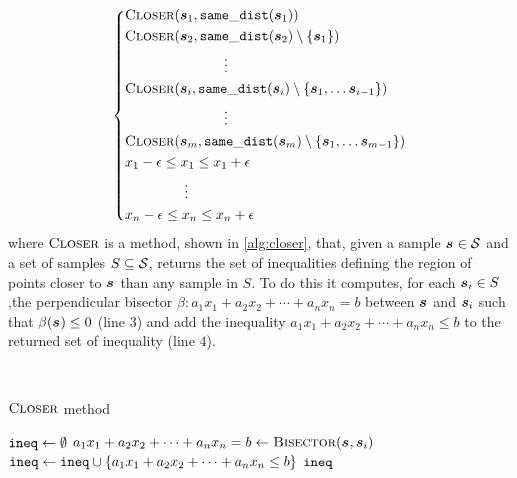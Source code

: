 \begin{equation}
\label{polytope-system}
  \left\{
  \begin{aligned}
    &\textsc{Closer}(\sample[1], \samedist{\sample[1]})\\
    &\textsc{Closer}(\sample[2], \samedist{\sample[2]}\setminus\{\sample[1]\})\\
    &\hspace{2.5cm}\vdots\\
    &\textsc{Closer}(\sample[i], \samedist{\sample[i]}\setminus\{\sample[1],\ldots \sample[i-1]\})\\
    &\hspace{2.5cm}\vdots\\
    &\textsc{Closer}(\sample[m], \samedist{\sample[m]}\setminus\{\sample[1],\ldots \sample[m-1]\})\\
    &x_1 - \epsilon \le x_1 \le x_1 + \epsilon\\
    &\hspace{1.5cm}\vdots\\
    &x_n - \epsilon \le x_n \le x_n + \epsilon
  \end{aligned}
  \right.
\end{equation}
where $\algtitle{Closer}$ is a method, shown in \autoref{alg:closer}, that, given a sample $\sample[] \in \set$ and a set of samples $S \subseteq  \set$, returns the set of inequalities defining the region of points closer to $\sample[]$ than any sample in $S$. To do this it computes, for each $\sample \in S$,the perpendicular bisector $\beta: a_1x_1 + a_2x_2 +\cdots+a_nx_n = b$ between $\sample[]$ and $\sample[i]$ such that $\beta(\sample[]) \le 0$ (line $3$) and add the inequality $a_1x_1 + a_2x_2 +\cdots+a_nx_n \le b$ to the returned set of inequality (line $4$).

\begin{algorithm}[H]\
	\caption[$\algtitle{Closer}$ method]{$\algtitle{Closer}$ method}
	\label{alg:closer}
	\begin{algorithmic}[1]
    \State $\var{ineq} \gets \emptyset$
      \State $a_1x_1 + a_2x_2 +\cdots+a_nx_n = b \gets \textsc{Bisector}(\sample[], \sample)$
      \State $\var{ineq} \gets \var{ineq} \cup \{a_1x_1 + a_2x_2 +\cdots+a_nx_n \le b\}$
    \EndFor
    \State \Return $\var{ineq}$
	\end{algorithmic}
\end{algorithm}

